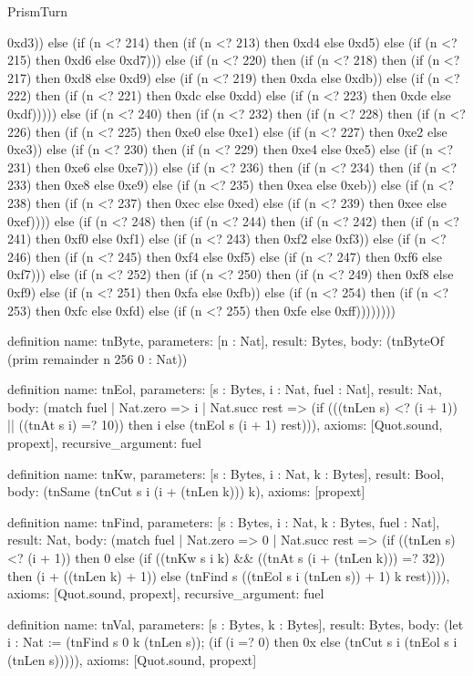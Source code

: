 \begin{lexlean}{PrismTurn}
\begin{semanticmodule}
{0xd3)) else (if (n <? 214) then (if (n <? 213) then 0xd4 else 0xd5) else (if (n <? 215) then 0xd6 else 0xd7))) else (if (n <? 220) then (if (n <? 218) then (if (n <? 217) then 0xd8 else 0xd9) else (if (n <? 219) then 0xda else 0xdb)) else (if (n <? 222) then (if (n <? 221) then 0xdc else 0xdd) else (if (n <? 223) then 0xde else 0xdf))))) else (if (n <? 240) then (if (n <? 232) then (if (n <? 228) then (if (n <? 226) then (if (n <? 225) then 0xe0 else 0xe1) else (if (n <? 227) then 0xe2 else 0xe3)) else (if (n <? 230) then (if (n <? 229) then 0xe4 else 0xe5) else (if (n <? 231) then 0xe6 else 0xe7))) else (if (n <? 236) then (if (n <? 234) then (if (n <? 233) then 0xe8 else 0xe9) else (if (n <? 235) then 0xea else 0xeb)) else (if (n <? 238) then (if (n <? 237) then 0xec else 0xed) else (if (n <? 239) then 0xee else 0xef)))) else (if (n <? 248) then (if (n <? 244) then (if (n <? 242) then (if (n <? 241) then 0xf0 else 0xf1) else (if (n <? 243) then 0xf2 else 0xf3)) else (if (n <? 246) then (if (n <? 245) then 0xf4 else 0xf5) else (if (n <? 247) then 0xf6 else 0xf7))) else (if (n <? 252) then (if (n <? 250) then (if (n <? 249) then 0xf8 else 0xf9) else (if (n <? 251) then 0xfa else 0xfb)) else (if (n <? 254) then (if (n <? 253) then 0xfc else 0xfd) else (if (n <? 255) then 0xfe else 0xff))))))))
}

definition{
  name: tnByte,
  parameters: [n : Nat],
  result: Bytes,
  body: (tnByteOf (prim remainder n 256 0 : Nat))
}

definition{
  name: tnEol,
  parameters: [s : Bytes, i : Nat, fuel : Nat],
  result: Nat,
  body: (match fuel
    | Nat.zero => i
    | Nat.succ rest => (if (((tnLen s) <? (i + 1)) || ((tnAt s i) =? 10)) then i else (tnEol s (i + 1) rest))),
  axioms: [Quot.sound, propext],
  recursive_argument: fuel
}

definition{
  name: tnKw,
  parameters: [s : Bytes, i : Nat, k : Bytes],
  result: Bool,
  body: (tnSame (tnCut s i (i + (tnLen k))) k),
  axioms: [propext]
}

definition{
  name: tnFind,
  parameters: [s : Bytes, i : Nat, k : Bytes, fuel : Nat],
  result: Nat,
  body: (match fuel
    | Nat.zero => 0
    | Nat.succ rest => (if ((tnLen s) <? (i + 1)) then 0 else (if ((tnKw s i k) && ((tnAt s (i + (tnLen k))) =? 32)) then (i + ((tnLen k) + 1)) else (tnFind s ((tnEol s i (tnLen s)) + 1) k rest)))),
  axioms: [Quot.sound, propext],
  recursive_argument: fuel
}

definition{
  name: tnVal,
  parameters: [s : Bytes, k : Bytes],
  result: Bytes,
  body: (let i : Nat := (tnFind s 0 k (tnLen s)); (if (i =? 0) then 0x else (tnCut s i (tnEol s i (tnLen s))))),
  axioms: [Quot.sound, propext]
}


\end{semanticmodule}
\end{lexlean}
